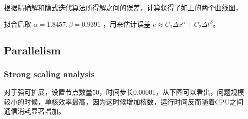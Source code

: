 \documentclass[3p]{elsarticle}
\numberwithin{equation}{section}
\begin{document}
    

    根据精确解和隐式迭代算法所得解之间的误差，计算获得了如上的两个曲线图，
    
    拟合后取 $ \alpha = 1.8457 , \beta = 0.9391 $ ，用来估计误差 $ e \approx C_{1} \Delta x^{\alpha}+C_{2} \Delta t^{\beta} $。
    
    \clearpage
    

	\subsection{Parallelism}
	\subsubsection{Strong scaling analysis}
	对于强可扩展，设置节点数量50，时间步长0.00001，从下图可以看出，问题规模较小的时候，单核效率最高，因为这时候增加核数，运行时间反而随着CPU之间通信消耗显著增加。
\end{document}
